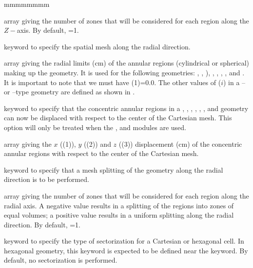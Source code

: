 \begin{ListeDeDescription}{mmmmmmmm}
\item[\dusa{ispltz}] array giving the number of zones that will be considered for each region along the
$Z-$axis. By default,
=1.

\item[\moc{RADIUS}] keyword to specify the spatial mesh along the radial direction.

\item[\dusa{rrr}] array giving the radial limits (cm) of the annular
regions (cylindrical or spherical) making up the geometry. It is used for the
following geometries: , , ), ,
, , ,  and . It
is important to note that we must have (1)=0.0. The other values
of ($i$) in a -- or --type geometry are
defined as shown in .

\item[\moc{OFFCENTER}] keyword to specify that the concentric annular regions in a ,
, ,
, , ,  and  geometry can now be displaced with
respect to the center of the Cartesian mesh. This option will only be treated when the ,
 and  modules are used.

\item[\dusa{disxyz}] array giving the $x$ ((1)), $y$ ((2)) and $z$
((3)) displacement (cm) of the concentric annular regions with respect to the center of the
Cartesian mesh. 

\item[\moc{SPLITR}] keyword to specify that a mesh splitting of the geometry along the radial direction is
to be performed.

\item[\dusa{ispltr}] array giving the number of zones that will be considered for each region along the
radial axis.  A negative value results in a splitting of the regions into zones of equal volumes; a
positive value results in a uniform splitting along the radial direction. By default, =1.

\item[\moc{SECT}] keyword to specify the type of sectorization for a Cartesian
or hexagonal cell. In hexagonal geometry, this keyword is expected to be defined near the
 keyword. By default, no sectorization is performed.


\end{ListeDeDescription}
